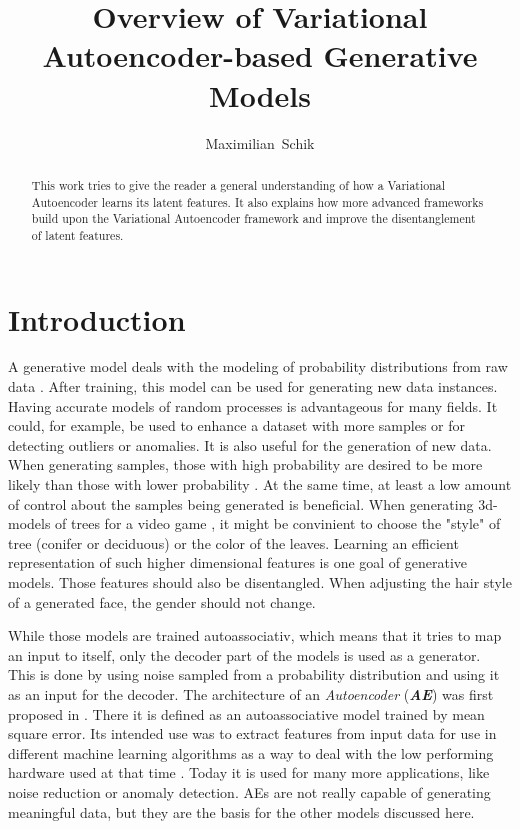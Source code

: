 \documentclass[a4paper]{IEEEtran}
\title{Overview of Variational Autoencoder-based Generative Models}
\author{Maximilian~Schik}
\begin{document}
\maketitle

\begin{abstract}
This work tries to give the reader a general understanding of how a Variational Autoencoder learns its latent features. It also explains how more advanced frameworks build upon the Variational Autoencoder framework and improve the disentanglement of latent features.
\end{abstract}

\section{Introduction}
A generative model deals with the modeling of probability distributions from raw data \cite{doersch2016tutorial}. After training, this model can be used for generating new data instances. Having accurate models of random processes is advantageous for many fields. It could, for example, be used to enhance a dataset with more samples or for detecting outliers or anomalies. It is also useful for the generation of new data. When generating samples, those with high probability are desired to be more likely than those with lower probability \cite{doersch2016tutorial}. At the same time, at least a low amount of control about the samples being generated is beneficial. When generating 3d-models of trees for a video game \cite{doersch2016tutorial}, it might be convinient to choose the "style" of tree (conifer or deciduous) or the color of the leaves. Learning an efficient representation of such higher dimensional features is one goal of generative models. Those features should also be disentangled. When adjusting the hair style of a generated face, the gender should not change.

While those models are trained autoassociativ, which means that it tries to map an input to itself, only the decoder part of the models is used as a generator. This is done by using noise sampled from a probability distribution and using it as an input for the decoder. The architecture of an \textit{Autoencoder} (\textit{\textbf{AE}}) was first proposed in \cite{ballard1987modulalearning}. There it is defined as an autoassociative model trained by mean square error. Its intended use was to extract features from input data for use in different machine learning algorithms as a way to deal with the low performing hardware used at that time \cite{ballard1987modulalearning}. Today it is used for many more applications, like noise reduction or anomaly detection. AEs are not really capable of generating meaningful data, but they are the basis for the other models discussed here.
\end{document}
